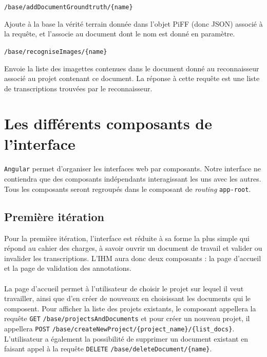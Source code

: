 \begin{description}[align=left]
\item [POST] \texttt{/base/addDocumentGroundtruth/\{name\}}\newline{}
\begin{itshape}
Ajoute à la base la vérité terrain donnée dans l'objet PiFF (donc JSON) associé à la requête, et l'associe au document dont le nom est donné en paramètre.
\end{itshape}

\item [GET] \texttt{/base/recogniseImages/\{name\}}\newline{}
\begin{itshape}
Envoie la liste des imagettes contenues dans le document donné au reconnaisseur associé au projet contenant ce document. La réponse à cette requête est une liste de transcriptions trouvées par le reconnaisseur.
\end{itshape}

\end{description}


\section{Les différents composants de l'interface}

\paragraph{}
\texttt{Angular} permet d'organiser les interfaces web par composants. Notre interface ne contiendra que des composants indépendants interagissant les uns avec les autres. Tous les composants seront regroupés dans le composant de \textit{routing} \texttt{app-root}.

\subsection{Première itération}

Pour la première itération, l’interface est réduite à sa forme la plus simple qui répond au cahier des charges, à savoir ouvrir un document de travail et valider ou invalider les transcriptions. L’IHM aura donc deux composants : la page d’accueil et la page de validation des annotations.

\paragraph{}
La page d’accueil permet à l’utilisateur de choisir le projet sur lequel il veut travailler, ainsi que d'en créer de nouveaux en choisissant les documents qui le composent. Pour afficher la liste des projets existants, le composant appellera la requête \texttt{GET} \texttt{/base/projectsAndDocuments} et pour créer un nouveau projet, il appellera \texttt{POST} \texttt{/base/createNewProject/\{project\_name\}/\{list\_docs\}}. L'utilisateur a également la possibilité de supprimer un document existant en faisant appel à la requête \texttt{DELETE} \texttt{/base/deleteDocument/\{name\}}.


